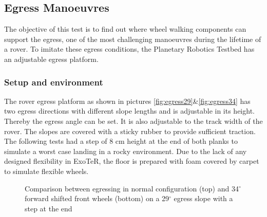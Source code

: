 \documentclass[a4paper,twocolumn]{esapub2005} %
\begin{document}
\subsection{Egress Manoeuvres} The objective of this test is to find out where
wheel walking components can support the egress, one of the most challenging
manoeuvres during the lifetime of a rover. To imitate these egress conditions,
the Planetary Robotics Testbed has an adjustable egress platform.


\subsubsection{Setup and environment} The rover egress platform as shown in
pictures \ref{fig:egress29}\&\ref{fig:egress34} has two egress directions with
different slope lengths and is adjustable in its height. Thereby the egress
angle can be set. It is also adjustable to the track width of the rover. The
slopes are covered with a sticky rubber to provide sufficient traction. The
following tests had a step of 8 cm height at the end of both planks to simulate
a worst case landing in a rocky environment.  Due to the lack of any designed
flexibility in ExoTeR, the floor is prepared with foam covered by carpet to
simulate flexible wheels. 
\begin{figure}[h]
    \centering
        \caption{Comparison between egressing in normal configuration (top) and
        34$^{\circ}$ forward shifted front wheels (bottom) on a 29$^{\circ}$
        egress slope with a step at the end} \label{fig:egress29com}
\end{figure}
\end{document}
